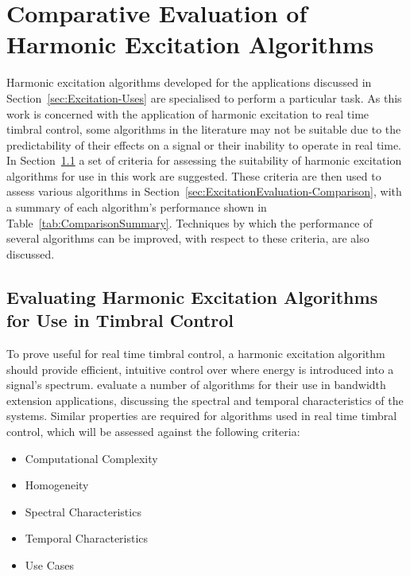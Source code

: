 
\chapter{Comparative Evaluation of Harmonic Excitation Algorithms}
\label{chap:ExcitationEvaluation}
	Harmonic excitation algorithms developed for the applications discussed in Section~\ref{sec:Excitation-Uses} are
	specialised to perform a particular task. As this work is concerned with the application of harmonic excitation to
	real time timbral control, some algorithms in the literature may not be suitable due to the predictability of their
	effects on a signal or their inability to operate in real time. In
	Section~\ref{sec:ExcitationEvaluation-Evaluation} a set of criteria for assessing the suitability of harmonic
	excitation algorithms for use in this work are suggested. These criteria are then used to assess various algorithms
	in Section~\ref{sec:ExcitationEvaluation-Comparison}, with a summary of each algorithm's performance shown in
	Table~\ref{tab:ComparisonSummary}. Techniques by which the performance of several algorithms can be improved, with
	respect to these criteria, are also discussed.

\section{Evaluating Harmonic Excitation Algorithms for Use in Timbral Control}
\label{sec:ExcitationEvaluation-Evaluation}
	To prove useful for real time timbral control, a harmonic excitation algorithm should provide efficient, intuitive
	control over where energy is introduced into a signal's spectrum. \citet{larsen2004audio} evaluate a number of
	algorithms for their use in bandwidth extension applications, discussing the spectral and temporal characteristics
	of the systems. Similar properties are required for algorithms used in real time timbral control, which will be
	assessed against the following criteria:

	\begin{itemize}
		\item Computational Complexity
		\item Homogeneity
		\item Spectral Characteristics
		\item Temporal Characteristics
		\item Use Cases
	\end{itemize}

